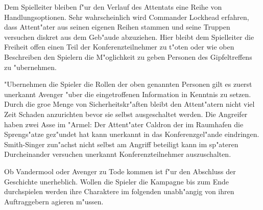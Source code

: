 \begin{remarks}
	Dem Spielleiter bleiben f"ur den Verlauf des Attentats eine Reihe von Handlungsoptionen. Sehr wahrscheinlich wird Commander Lockhead erfahren, dass Attent"ater aus seinen eigenen Reihen stammen und seine Truppen versuchen diskret aus dem Geb"aude abzuziehen. Hier bleibt dem Spielleiter die Freiheit offen einen Teil der Konferenzteilnehmer zu t"oten oder wie oben Beschreiben den Spielern die M"oglichkeit zu geben Personen des Gipfeltreffens zu "ubernehmen.
	
	"Ubernehmen die Spieler die Rollen der oben genannten Personen gilt es zuerst unerkannt Avenger "uber die eingetroffenen Information in Kenntnis zu setzen. Durch die gro\3e Menge von Sicherheitskr"aften bleibt den Attent"atern nicht viel Zeit Schaden anzurichten bevor sie selbst ausgeschaltet werden. Die Angreifer haben zwei Asse im "Armel: Der Attent"ater Caldron der im Raumhafen die Sprengs"atze gez"undet hat kann unerkannt in das Konferenzgel"ande eindringen. Smith-Singer zun"achst nicht selbst am Angriff beteiligt kann im sp"ateren Durcheinander versuchen unerkannt Konferenzteilnehmer auszuschalten.
	
	Ob Vandermool oder Avenger zu Tode kommen ist f"ur den Abschluss der Geschichte unerheblich. Wollen die Spieler die Kampagne bis zum Ende durchspielen werden ihre Charaktere im folgenden unabh"angig von ihren Auftraggebern agieren m"ussen.
\end{remarks}
